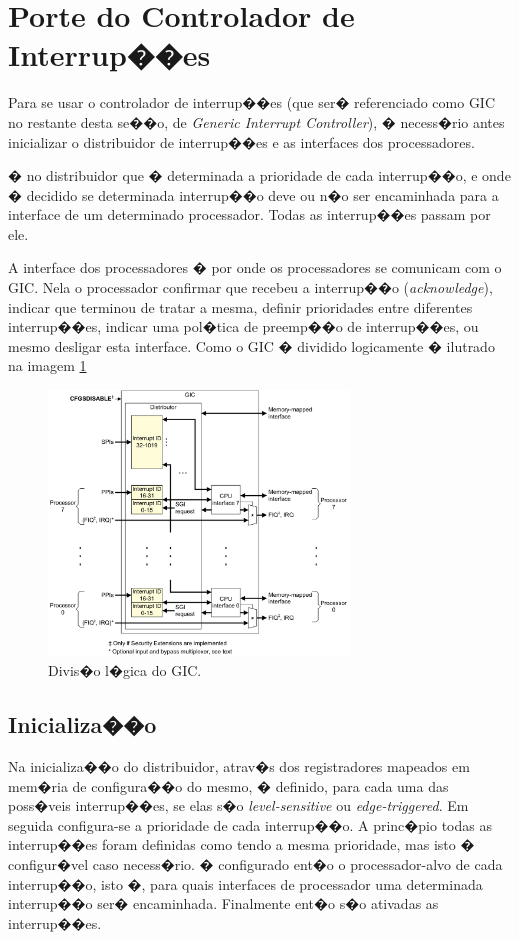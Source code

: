 \documentclass{ufscThesis/ufscThesis} %
\begin{document}
\section{Porte do Controlador de Interrup��es}



Para se usar o controlador de interrup��es (que ser� referenciado como GIC no restante desta se��o, de \emph{Generic Interrupt Controller}), � necess�rio antes inicializar o distribuidor de interrup��es e as interfaces dos processadores.

� no distribuidor que � determinada a prioridade de cada interrup��o, e onde � decidido se determinada interrup��o deve ou n�o ser encaminhada para a interface de um determinado processador. Todas as interrup��es passam por ele.

A interface dos processadores � por onde os processadores se comunicam com o GIC. Nela o processador confirmar que recebeu a interrup��o (\emph{acknowledge}), indicar que terminou de tratar a mesma, definir prioridades entre diferentes interrup��es, indicar uma pol�tica de preemp��o de interrup��es, ou mesmo desligar esta interface. Como o GIC � dividido logicamente � ilutrado na imagem \ref{img:gic}

\begin{figure}[ht!]
    \centering
    \includegraphics[width=8cm]{figuras/gic}
    \caption{Divis�o l�gica do GIC.}
    \label{img:gic}
\end{figure}

\subsection{Inicializa��o}

Na inicializa��o do distribuidor, atrav�s dos registradores mapeados em mem�ria de configura��o do mesmo, � definido, para cada uma das poss�veis interrup��es, se elas s�o \emph{level-sensitive} ou \emph{edge-triggered}.
Em seguida configura-se a prioridade de cada interrup��o. A princ�pio todas as interrup��es foram definidas como tendo a mesma prioridade, mas isto � configur�vel caso necess�rio.
� configurado ent�o o processador-alvo de cada interrup��o, isto �, para quais interfaces de processador uma determinada interrup��o ser� encaminhada. Finalmente ent�o s�o ativadas as interrup��es.
\end{document}
